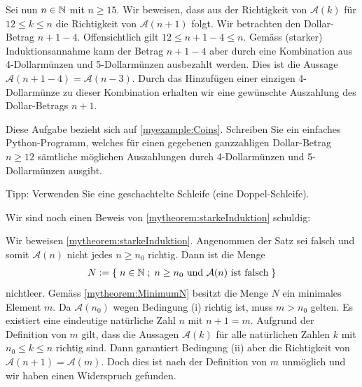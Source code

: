 \begin{myexample}
Sei nun $n\in\mathbb{N}$ mit $n\geq 15$. Wir beweisen, dass aus der Richtigkeit von $\mathcal{A}(k)$ für $12\leq k \leq n$ die Richtigkeit von $\mathcal{A}(n+1)$ folgt. Wir betrachten den Dollar-Betrag $n+1-4$. Offensichtlich gilt $12\leq n+1-4\leq n$. Gemäss (starker) Induktionsannahme kann der Betrag $n+1-4$ aber durch eine Kombination aus 4-Dollarmünzen und 5-Dollarmünzen ausbezahlt werden. Dies ist die Aussage $\mathcal{A}(n+1-4) = \mathcal{A}(n-3)$. Durch das Hinzufügen einer einzigen 4-Dollarmünze zu dieser Kombination erhalten wir eine gewünschte Auszahlung des Dollar-Betrags $n+1$.
\end{myexample}

\begin{myexercise}\label{myexercise:0208}
	Diese Aufgabe bezieht sich auf \cref{myexample:Coins}. Schreiben Sie ein einfaches Python-Programm, welches für einen gegebenen ganzzahligen Dollar-Betrag $n\geq 12$ sämtliche möglichen Auszahlungen durch 4-Dollarmünzen und 5-Dollarmünzen ausgibt.

	\noindent
	Tipp: Verwenden Sie eine geschachtelte Schleife (eine Doppel-Schleife).
\end{myexercise}

\noindent
Wir sind noch einen Beweis von \cref{mytheorem:starkeInduktion} schuldig:

\begin{myproof}
	Wir beweisen \cref{mytheorem:starkeInduktion}. Angenommen der Satz sei falsch und somit $\mathcal{A}(n)$ nicht jedes $n\geq n_0$ richtig. Dann ist die Menge
	\begin{align*}
		N := \left\{\;n\in\mathbb{N} \; ; \; \text{$n\geq n_0$ und $\mathcal{A}(n)$ ist falsch} \;\right\}
	\end{align*}
	nichtleer. Gemäss \cref{mytheorem:MinimumN} besitzt die Menge $N$ ein minimales Element $m$. Da $\mathcal{A}(n_0)$ wegen Bedingung (i) richtig ist, muss $m>n_0$ gelten. Es existiert eine eindeutige natürliche Zahl $n$ mit $n+1 = m$. Aufgrund der Definition von $m$ gilt, dass die Aussagen $\mathcal{A}(k)$ für alle natürlichen Zahlen $k$ mit $n_0\leq k\leq n$ richtig sind. Dann garantiert Bedingung (ii) aber die Richtigkeit von $\mathcal{A}(n+1) = \mathcal{A}(m)$. Doch dies ist nach der Definition von $m$ unmöglich und wir haben einen Widerspruch gefunden.
\end{myproof}

